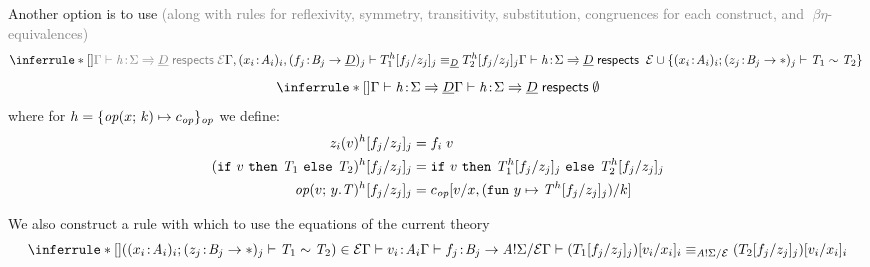 \documentclass[usenames,dvipsnames]{beamer}
\begin{document}
\begin{frame}
	Another option is to use \textcolor{gray}{(along with rules for reflexivity, symmetry, transitivity, substitution, congruences for each
	construct, and $\beta\eta$-equivalences)}
	\[
		\inferrule*[]
		{ 
			\textcolor{gray}{\respects{\hcases}{\eqE}{\sig}{\ctyD}} \\
			\ljudgement{\ctx, (x_i \oftype \tyA_i)_i, (f_j \oftype \tyB_j \to \ctyD)_j}{}
			{\thandle{T_1}{f_j \subsfor z_j}_j 
			\lequal_{\ctyD} 
			\thandle{T_2}{f_j \subsfor z_j}_j}
		}
		{ \respects{\hcases}{\;\eqE \union \left \{
			\teqjudgement{\tenvlong
				{(x_i \oftype \tyA_i)_i}
				{(z_j \oftype \tyB_j \to \anytype)_j}}
			{\tmplT_1 \rel \tmplT_2}
			\right \} \;}{\sig}{\ctyD}
		}
	\]
	\[
		\inferrule*[]
		{ \welltyped{\hcases}{\sig \casesto \ctyD} }
		{ \respects{\hcases}{\nil}{\sig}{\ctyD} }
	\]
	where for $h = \set{\operation{x}{k} \mapsto c_{\op}}_{\op}$ we define:
	\begin{align*}
		\thandle{z_i(v)}{f_j \subsfor z_j}_j &= \apply{f_i}{v} \\
		\thandle{(\ifclause{v}{\tmplT_1}{\tmplT_2})}{f_j \subsfor z_j}_j &= 
		\ifclause{v}
		{\thandle{\tmplT_1}{f_j \subsfor z_j}_j}
		{\thandle{\tmplT_2}{f_j \subsfor z_j}_j}\\
		\thandle{\operation{v}{y.\tmplT}}{f_j \subsfor z_j}_j &=
		\subs{c_{\op}}{v \subsfor x, (\fun{y}{\thandle{\tmplT}{f_j \subsfor z_j}_j}) \subsfor k}
	\end{align*}
\end{frame}
\begin{frame}
	We also construct a rule with which to use the equations of the current theory
	\[
		\inferrule*[]
		{ \left(\teqjudgement{\tenvlong
				{(x_i \oftype \tyA_i)_i}
				{(z_j \oftype \tyB_j \to \anytype)_j}
			}{\tmplT_1 \rel \tmplT_2}
		  \right) \in \eqE
		  \\
		  \welltyped{v_i}{\tyA_i}
		  \\
		  \welltyped{f_j}{\tyB_j \to \ctypebasic}
		}
		{ \eqjudg
			{\subs{(\subs{T_1}{f_j \subsfor z_j}_j)}{v_i \subsfor x_i}_i}
			{\subs{(\subs{T_2}{f_j \subsfor z_j}_j)}{v_i \subsfor x_i}_i}
			{\ctypebasic}
		}
	\]
\end{frame}
\end{document}
